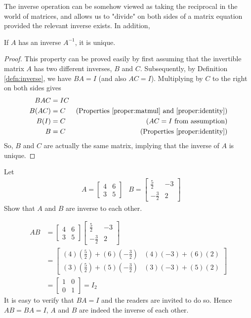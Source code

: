 The inverse operation can be somehow viewed as taking the reciprocal in the world of matrices, and allows us to "divide" on both sides of a matrix equation provided the relevant inverse exists. In addition,
\begin{proper}
\label{proper:uniqueinverse}
If $A$ has an inverse $A^{-1}$, it is unique.
\end{proper}
\begin{proof}
This property can be proved easily by first assuming that the invertible matrix $A$ has two different inverses, $B$ and $C$. Subsequently, by Definition \ref{defn:inverse}, we have $BA = I$ (and also $AC = I$). Multiplying by $C$ to the right on both sides gives
\begin{align*}
BAC &= IC \\
B(AC) &= C & \text{(Properties \ref{proper:matmul} and \ref{proper:identity})}\\
B(I) &= C & \text{($AC = I$ from assumption)} \\
B &= C & \text{(Properties \ref{proper:identity})}
\end{align*}
So, $B$ and $C$ are actually the same matrix, implying that the inverse of $A$ is unique.    
\end{proof}
\begin{exmp}
Let 
\begin{align*}
& A =
\begin{bmatrix}
4 & 6 \\
3 & 5
\end{bmatrix}
& B =
\begin{bmatrix}
\frac{5}{2} & -3 \\
-\frac{3}{2} & 2
\end{bmatrix}
\end{align*}
Show that $A$ and $B$ are inverse to each other.
\end{exmp}
\begin{solution}
\begin{align*}
AB &= 
\begin{bmatrix}
4 & 6 \\
3 & 5
\end{bmatrix}
\begin{bmatrix}
\frac{5}{2} & -3 \\
-\frac{3}{2} & 2
\end{bmatrix} \\
&= 
\begin{bmatrix}
(4)(\frac{5}{2})+(6)(-\frac{3}{2}) & (4)(-3)+(6)(2) \\
(3)(\frac{5}{2})+(5)(-\frac{3}{2}) & (3)(-3)+(5)(2)
\end{bmatrix} \\
&= 
\begin{bmatrix}
1 & 0 \\
0 & 1
\end{bmatrix} = I_2
\end{align*}
It is easy to verify that $BA = I$ and the readers are invited to do so. Hence $AB = BA = I$, $A$ and $B$ are indeed the inverse of each other.
\end{solution}

